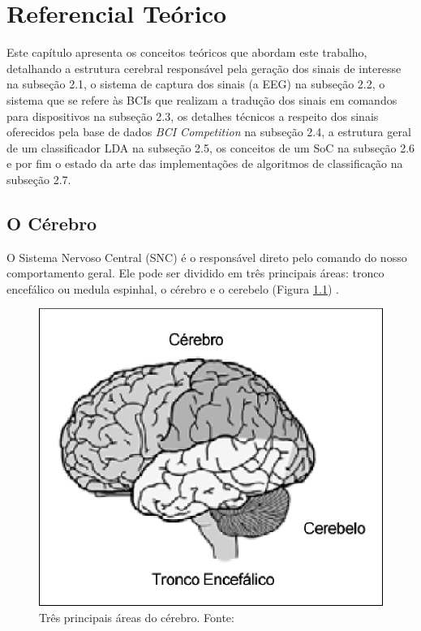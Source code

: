
\chapter[Referencial Teórico]{Referencial Teórico}
Este capítulo apresenta os conceitos teóricos que abordam este trabalho, detalhando a estrutura cerebral responsável pela geração dos sinais de interesse na subseção 2.1, o sistema de captura dos sinais (a EEG) na subseção 2.2, o sistema que se refere às BCIs que realizam a tradução dos sinais em comandos para dispositivos na subseção 2.3, os detalhes técnicos a respeito dos sinais oferecidos pela base de dados \textit{BCI Competition} na subseção 2.4, a estrutura geral de um classificador LDA na subseção 2.5, os conceitos de um SoC na subseção 2.6 e por fim o estado da arte das implementações de algoritmos de classificação na subseção 2.7. 

\section{O Cérebro}
O Sistema Nervoso Central (SNC) é o responsável direto pelo comando do nosso comportamento geral\cite{David_Clarck}. Ele pode ser dividido em três principais áreas: tronco encefálico ou medula espinhal, o cérebro e o cerebelo (Figura \ref{BrainParts}) \cite{alvarezneurobiomecanismos}.

\begin{figure}[h]
	\centering
	\includegraphics[keepaspectratio=true,scale=1.0]{figuras/estrutura_cerebral.eps}
	\caption{Três principais áreas do cérebro. Fonte: \cite{alvarezneurobiomecanismos}}
	\label{BrainParts}
\end{figure}

